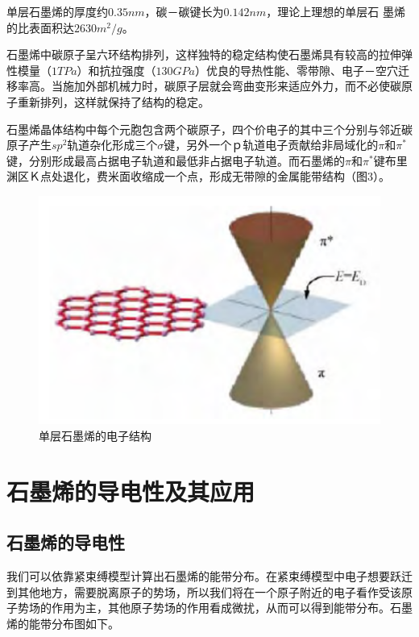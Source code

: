 单层石墨烯的厚度约$0.35nm$，碳－碳键长为$0.142nm$，理论上理想的单层石 墨烯的比表面积达$2630m^{2}/g$。\par
石墨烯中碳原子呈六环结构排列，这样独特的稳定结构使石墨烯具有较高的拉伸弹性模量（$1TPa$）和抗拉强度（$130GPa$）优良的导热性能、零带隙、电子－空穴迁移率高。当施加外部机械力时，碳原子层就会弯曲变形来适应外力，而不必使碳原子重新排列，这样就保持了结构的稳定。\par
石墨烯晶体结构中每个元胞包含两个碳原子，四个价电子的其中三个分别与邻近碳原子产生$sp^{2}$轨道杂化形成三个$\sigma$键，另外一个ｐ轨道电子贡献给非局域化的$\pi$和$\pi^{*}$键，分别形成最高占据电子轨道和最低非占据电子轨道。而石墨烯的$\pi$和$\pi^{*}$键布里渊区Ｋ点处退化，费米面收缩成一个点，形成无带隙的金属能带结构（图3）。\par
\begin{figure}[H]
    \centering
    \includegraphics{img/单层石墨烯的电子结构.png}
    \caption{单层石墨烯的电子结构}
    \label{fig:my_label}
\end{figure}

\section{石墨烯的导电性及其应用}
\subsection{石墨烯的导电性}


我们可以依靠紧束缚模型计算出石墨烯的能带分布。在紧束缚模型中电子想要跃迁到其他地方，需要脱离原子的势场，所以我们将在一个原子附近的电子看作受该原子势场的作用为主，其他原子势场的作用看成微扰，从而可以得到能带分布。石墨烯的能带分布图如下。\par

